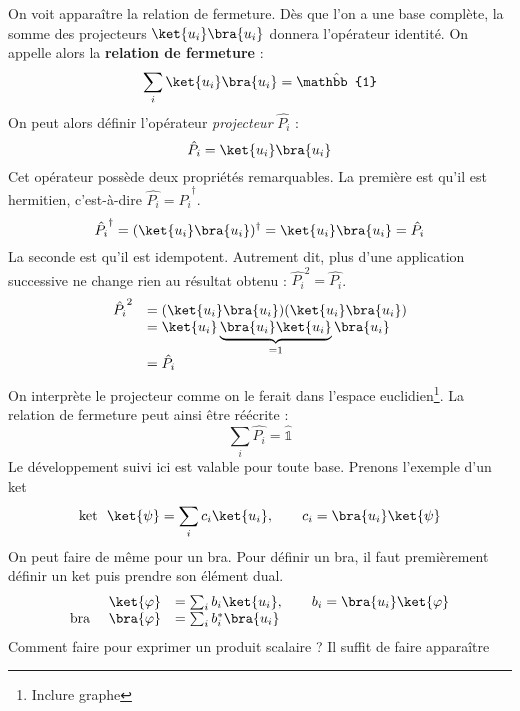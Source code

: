 On voit apparaître la relation de fermeture. Dès que l'on a une base complète, la somme des projecteurs
$\ket{u_i}\bra{u_i}$ donnera l'opérateur identité. On appelle alors la \textbf{relation 
de fermeture} :
\begin{equation}
\sum_i \ket{u_i}\bra{u_i} = \hat{\mathbb{1}}
\end{equation}
On peut alors définir l'opérateur \textit{projecteur} $\hat{P_i}$ :
\begin{equation}
\hat{P_i} = \ket{u_i}\bra{u_i}
\end{equation}
Cet opérateur possède deux propriétés remarquables. La première est qu'il est hermitien, 
c'est-à-dire $\hat{P_i} = \hat{P_i}^\dagger$.
\begin{equation}
\hat{P_i}^\dagger = (\ket{u_i}\bra{u_i})^\dagger = \ket{u_i}\bra{u_i} = \hat{P_i}
\end{equation}
La seconde est qu'il est idempotent. Autrement dit, plus d'une application successive ne 
change rien au résultat obtenu : $\hat{P_i}^2 = \hat{P_i}$.
\begin{equation}
\begin{array}{ll}
\hat{P_i}^2 &= (\ket{u_i}\bra{u_i})(\ket{u_i}\bra{u_i})\\
&= \ket{u_i}\underbrace{\bra{u_i}\ket{u_i}}_{=1}\bra{u_i}\\
&= \hat{P_i}
\end{array}
\end{equation}
On interprète le projecteur comme on le ferait dans l'espace euclidien\footnote{Inclure 
graphe}. La relation de fermeture peut ainsi être réécrite :
\begin{equation}
\sum_i \hat{P_i} = \hat{\mathbb{1}}
\end{equation}
Le développement suivi ici est valable pour toute base. Prenons l'exemple d'un ket
\begin{equation}
\text{ket }\ \ket{\psi} = \sum_i c_i\ket{u_i},\qquad c_i = \bra{u_i}\ket{\psi}
\end{equation}
On peut faire de même pour un bra. Pour définir un bra, il faut premièrement définir 
un ket puis prendre son élément dual.
\begin{equation}
\begin{array}{lll}
& \ket{\varphi} &= \sum_i b_i\ket{u_i},\qquad b_i = \bra{u_i}\ket{\varphi}\\
\text{bra } & \bra{\varphi} &= \sum_i b_i^* \bra{u_i}
\end{array}
\end{equation}
Comment faire pour exprimer un produit scalaire ? Il suffit de faire apparaître 
